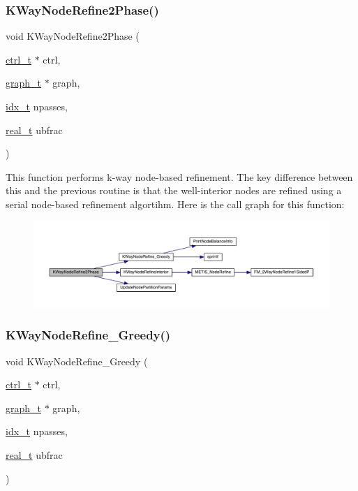 \subsubsection{\texorpdfstring{K\+Way\+Node\+Refine2\+Phase()}{KWayNodeRefine2Phase()}}
{\footnotesize\ttfamily void K\+Way\+Node\+Refine2\+Phase (\begin{DoxyParamCaption}\item[{\hyperlink{a00742}{ctrl\+\_\+t} $\ast$}]{ctrl,  }\item[{\hyperlink{a00734}{graph\+\_\+t} $\ast$}]{graph,  }\item[{\hyperlink{a00876_aaa5262be3e700770163401acb0150f52}{idx\+\_\+t}}]{npasses,  }\item[{\hyperlink{a00876_a1924a4f6907cc3833213aba1f07fcbe9}{real\+\_\+t}}]{ubfrac }\end{DoxyParamCaption})}

This function performs k-\/way node-\/based refinement. The key difference between this and the previous routine is that the well-\/interior nodes are refined using a serial node-\/based refinement algortihm. Here is the call graph for this function\+:\nopagebreak
\begin{figure}[H]
\begin{center}
\leavevmode
\includegraphics[width=350pt]{a00951_a5c42d043dc7f9e6d0b955a4d004a7470_cgraph}
\end{center}
\end{figure}
\mbox{\label{a00951_a5c9aaeced318b88b4ad50dcb484d47b1}} 
\subsubsection{\texorpdfstring{K\+Way\+Node\+Refine\+\_\+\+Greedy()}{KWayNodeRefine\_Greedy()}}
{\footnotesize\ttfamily void K\+Way\+Node\+Refine\+\_\+\+Greedy (\begin{DoxyParamCaption}\item[{\hyperlink{a00742}{ctrl\+\_\+t} $\ast$}]{ctrl,  }\item[{\hyperlink{a00734}{graph\+\_\+t} $\ast$}]{graph,  }\item[{\hyperlink{a00876_aaa5262be3e700770163401acb0150f52}{idx\+\_\+t}}]{npasses,  }\item[{\hyperlink{a00876_a1924a4f6907cc3833213aba1f07fcbe9}{real\+\_\+t}}]{ubfrac }\end{DoxyParamCaption})}

